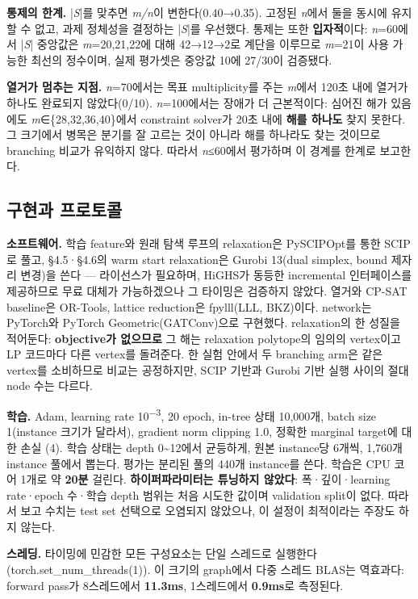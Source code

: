 \documentclass[final,5p,twocolumn]{elsarticle}
\begin{document}
\textbf{통제의 한계.} |\textit{S}|를 맞추면 \textit{m/n}이 변한다(0.40→0.35). 고정된 \textit{n}에서 둘을 동시에 유지할 수 없고, 과제 정체성을 결정하는 |\textit{S}|를 우선했다. 통제는 또한 \textbf{입자적}이다: \textit{n}=60에서 |\textit{S}| 중앙값은 \textit{m}=20,21,22에 대해 42→12→2로 계단을 이루므로 \textit{m}=21이 사용 가능한 최선의 정수이며, 실제 평가셋은 중앙값 10에 27/30이 검증됐다.

\textbf{열거가 멈추는 지점.} \textit{n}=70에서는 목표 multiplicity를 주는 \textit{m}에서 120초 내에 열거가 하나도 완료되지 않았다(0/10). \textit{n}=100에서는 장애가 더 근본적이다: 심어진 해가 있음에도 \textit{m}∈\{28,32,36,40\}에서 constraint solver가 20초 내에 \textbf{해를 하나도} 찾지 못한다. 그 크기에서 병목은 분기를 잘 고르는 것이 아니라 해를 하나라도 찾는 것이므로 branching 비교가 유익하지 않다. 따라서 \textit{n}≤60에서 평가하며 이 경계를 한계로 보고한다.

\subsection{구현과 프로토콜}
\textbf{소프트웨어.} 학습 feature와 원래 탐색 루프의 relaxation은 PySCIPOpt를 통한 SCIP로 풀고, §4.5·§4.6의 warm start relaxation은 Gurobi 13(dual simplex, bound 제자리 변경)을 쓴다 — 라이선스가 필요하며, HiGHS가 동등한 incremental 인터페이스를 제공하므로 무료 대체가 가능하겠으나 그 타이밍은 검증하지 않았다. 열거와 CP-SAT baseline은 OR-Tools, lattice reduction은 fpylll(LLL, BKZ)이다. network는 PyTorch와 PyTorch Geometric(GATConv)으로 구현했다. relaxation의 한 성질을 적어둔다: \textbf{objective가 없으므로} 그 해는 relaxation polytope의 임의의 vertex이고 LP 코드마다 다른 vertex를 돌려준다. 한 실험 안에서 두 branching arm은 같은 vertex를 소비하므로 비교는 공정하지만, SCIP 기반과 Gurobi 기반 실행 사이의 절대 node 수는 다르다.

\textbf{학습.} Adam, learning rate 10\textsuperscript{−3}, 20 epoch, in-tree 상태 10,000개, batch size 1(instance 크기가 달라서), gradient norm clipping 1.0, 정확한 marginal target에 대한 손실 (4). 학습 상태는 depth 0\textasciitilde{}12에서 균등하게, 원본 instance당 6개씩, 1,760개 instance 풀에서 뽑는다. 평가는 분리된 풀의 440개 instance를 쓴다. 학습은 CPU 코어 1개로 약 \textbf{20분} 걸린다. \textbf{하이퍼파라미터는 튜닝하지 않았다}: 폭·깊이·learning rate·epoch 수·학습 depth 범위는 처음 시도한 값이며 validation split이 없다. 따라서 보고 수치는 test set 선택으로 오염되지 않았으나, 이 설정이 최적이라는 주장도 하지 않는다.

\textbf{스레딩.} 타이밍에 민감한 모든 구성요소는 단일 스레드로 실행한다(torch.set\_num\_threads(1)). 이 크기의 graph에서 다중 스레드 BLAS는 역효과다: forward pass가 8스레드에서 \textbf{11.3ms}, 1스레드에서 \textbf{0.9ms}로 측정된다.
\end{document}
